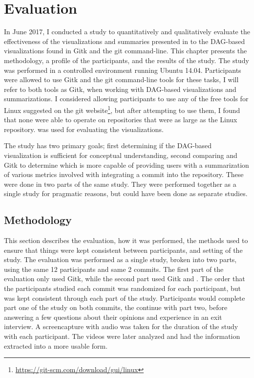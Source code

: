 \chapter{Evaluation}\label{chap:evaluation}

In June 2017, I conducted a study to quantitatively and qualitatively
evaluate the effectiveness of the visualizations and summaries presented
in \tool{} to the DAG-based visualizations found in Gitk and the git
command-line. This chapter presents the methodology, a profile of the
participants, and the results of the study. The study was performed in a
controlled environment running Ubuntu 14.04. Participants were allowed
to use Gitk and the git command-line tools for these tasks, I will refer
to both tools as Gitk, when working with DAG-based visualizations and
summarizations. I considered allowing participants to use any of the
free tools for Linux suggested on the git
website\footnote{\url{https://git-scm.com/download/gui/linux}}, but
after attempting to use them, I found that none were able to operate on
repositories that were as large as the Linux repository. \tool{} was
used for evaluating the  visualizations.

The study has two primary goals; first determining if the DAG-based
visualization is sufficient for conceptual understanding, second
comparing \tool and Gitk to determine which is more capable of providing
users with a summarization of various metrics involved with integrating
a commit into the repository. These were done in two parts of the same
study. They were performed together as a single study for pragmatic
reasons, but could have been done as separate studies.

\section{Methodology}\label{sec:methodology}

This section describes the evaluation, how it was performed, the methods
used to ensure that things were kept consistent between participants,
and setting of the study. The evaluation was performed as a single
study, broken into two parts, using the same 12 participants and same 2
commits. The first part of the evaluation only used Gitk, while the
second part used Gitk and \tool{}. The order that the participants
studied each commit was randomized for each participant, but was kept
consistent through each part of the study. Participants would complete
part one of the study on both commits, the continue with part two, before
answering a few questions about their opinions and experience in an exit
interview. A screencapture with audio was taken for the duration of the
study with each participant. The videos were later analyzed and had the
information extracted into a more usable form.

